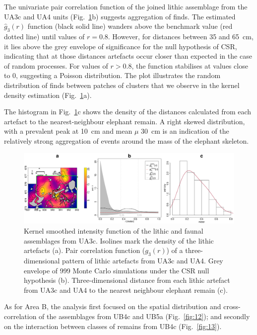 \documentclass[preprint,authoryear,times]{elsarticle} %
\begin{document}
The univariate pair correlation function of the joined lithic assemblage from the UA3c and UA4 units (Fig.~\ref{fig:11}b) suggests aggregation of finds. The estimated $\hat{g}_3(r)$ function (black solid line) wanders above the benchmark value (red dotted line) until values of $r=0.8$. However, for distances between 35 and 65~cm, it lies above the grey envelope of significance for the null hypothesis of CSR, indicating that at those distances artefacts occur closer than expected in the case of random processes. For values of $r>0.8$, the function stabilises at values close to 0, suggesting a Poisson distribution. The plot illustrates the random distribution of finds between patches of clusters that we observe in the kernel density estimation (Fig.~\ref{fig:11}a).

The histogram in Fig.~\ref{fig:11}c shows the density of the distances calculated from each artefact to the nearest-neighbour elephant remain. A right skewed distribution, with a prevalent peak at 10~cm and mean $\mu$ 30~cm is an indication of the relatively strong aggregation of events around the mass of the elephant skeleton.

\begin{figure}[]
  \centering
  \includegraphics[width=1\textwidth]{../artwork/Fig11.eps}
  \caption{Kernel smoothed intensity function of the lithic and faunal assemblages from UA3c. Isolines mark the density of the lithic artefacts (a). Pair correlation function ($g_3(r)$) of a three-dimensional pattern of lithic artefacts from UA3c and UA4. Grey envelope of 999 Monte Carlo simulations under the CSR null hypothesis (b). Three-dimensional distance from each lithic artefact from UA3c and UA4 to the nearest neighbour elephant remain (c).}
  \label{fig:11}
\end{figure}


As for Area B, the analysis first focused on the spatial distribution and cross-correlation of the assemblages from UB4c and UB5a (Fig.~\ref{fig:12}); and secondly on the interaction between classes of remains from UB4c (Fig.~\ref{fig:13}).
\end{document}

